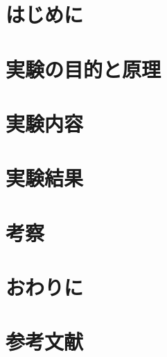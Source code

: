 \documentclass[11pt,a4j]{jsarticle}
\title{}
\author{1413176 三村幸祐}
\date{ \, }
\begin{document}
  
  
  
  
 \section{はじめに}
  
  
  
 \section{実験の目的と原理}
  
  
  
 \section{実験内容}
  
  
  
 \section{実験結果}
  
  
  
 \section{考察}
  
  
  
 \section{おわりに}
  
  
  
 \section{参考文献}
  
  
  
\end{document}
